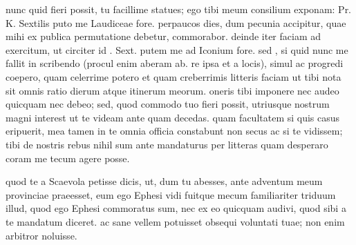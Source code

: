  nunc quid fieri possit, tu facillime statues; ego tibi meum consilium exponam: Pr. K. Sextilis puto me Laudiceae fore. perpaucos dies, dum pecunia accipitur, quae mihi ex publica permutatione debetur, commorabor. deinde iter faciam ad exercitum, ut circiter id . Sext. putem me ad Iconium fore. sed , si quid nunc me fallit in scribendo (procul enim aberam ab. re ipsa et a locis), simul ac progredi coepero, quam celerrime potero et quam creberrimis litteris faciam ut tibi nota sit omnis ratio dierum atque itinerum meorum. oneris tibi imponere nec audeo quicquam nec debeo; sed, quod commodo tuo fieri possit, utriusque nostrum magni interest ut te videam ante quam decedas. quam facultatem si quis casus eripuerit, mea tamen in te omnia officia constabunt non secus ac si te vidissem; tibi de nostris rebus nihil sum ante mandaturus per litteras quam desperaro coram me tecum agere posse.

 quod te a Scaevola petisse dicis, ut, dum tu abesses, ante adventum meum provinciae praeesset, eum ego Ephesi vidi fuitque mecum familiariter triduum illud, quod ego Ephesi commoratus sum, nec ex eo quicquam audivi, quod sibi a te mandatum diceret. ac sane vellem potuisset obsequi voluntati tuae; non enim arbitror noluisse.
